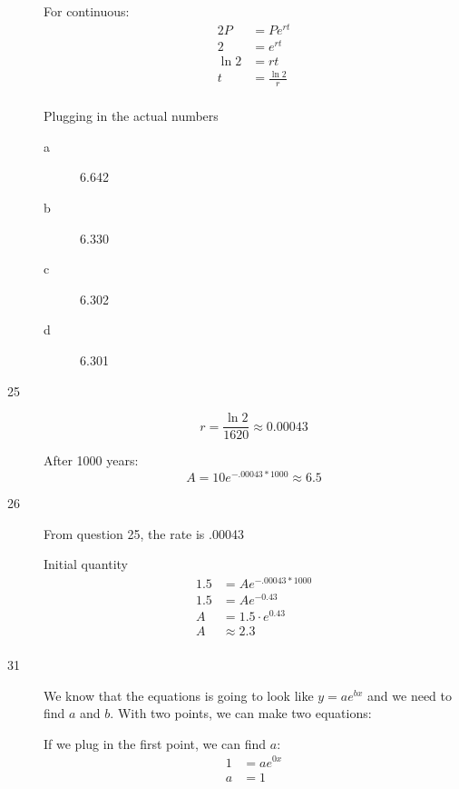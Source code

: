 \documentclass[fleqn,addpoints]{exam}
\begin{document}
\begin{description}
For continuous:
\begin{align*}
  2P &= P e^{rt} \\
  2 &=  e^{rt} \\
  \ln 2 &= rt \\
  t &= \frac{\ln 2}{r} \\
\end{align*}

Plugging in the actual numbers
\begin{description}
\item[a]
6.642

\item[b]
6.330

\item[c]
6.302

\item[d]
6.301

\end{description}




\item[25]
\[
  r = \frac{\ln 2}{1620} \approx 0.00043
\]

After 1000 years:
\[
  A = 10 e^{-.00043 * 1000} \approx 6.5
\]

\item[26]
From question 25, the rate is .00043

Initial quantity
\begin{align*}
  1.5 &= A e^{-.00043 * 1000} \\ 
  1.5 &= A e^{-0.43} \\
  A &= 1.5 \cdot e^{0.43} \\
  A &\approx 2.3 \\
\end{align*}

\item[31]
We know that the equations is going to look like $y=ae^{bx}$ and we need to find $a$ and $b$.  With two points, we can
make two equations:

If we plug in the first point, we can find $a$:
\begin{align*}
  1 &= ae^{0x} \\
  a &= 1 \\ 
\end{align*}


\end{description}
\end{document}
